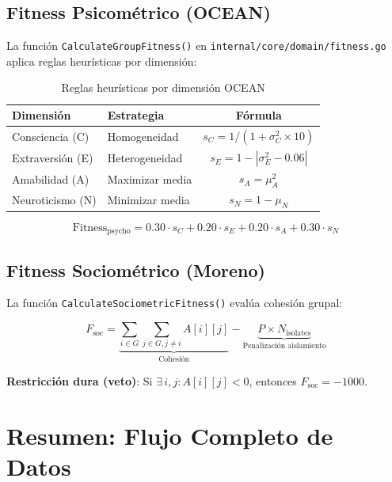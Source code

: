 \documentclass[12pt,a4paper]{article}
\begin{document}
\subsection{Fitness Psicométrico (OCEAN)}

La función \texttt{CalculateGroupFitness()} en \texttt{internal/core/domain/fitness.go} aplica reglas heurísticas por dimensión:

\begin{table}[h]
\centering
\begin{tabular}{llc}
\toprule
\textbf{Dimensión} & \textbf{Estrategia} & \textbf{Fórmula} \\
\midrule
Consciencia (C) & Homogeneidad & $s_C = 1 / (1 + \sigma^2_C \times 10)$ \\
Extraversión (E) & Heterogeneidad & $s_E = 1 - |\sigma^2_E - 0.06|$ \\
Amabilidad (A) & Maximizar media & $s_A = \mu_A^2$ \\
Neuroticismo (N) & Minimizar media & $s_N = 1 - \mu_N$ \\
\bottomrule
\end{tabular}
\caption{Reglas heurísticas por dimensión OCEAN}
\end{table}

\[
\text{Fitness}_{\text{psycho}} = 0.30 \cdot s_C + 0.20 \cdot s_E + 0.20 \cdot s_A + 0.30 \cdot s_N
\]

\subsection{Fitness Sociométrico (Moreno)}

La función \texttt{CalculateSociometricFitness()} evalúa cohesión grupal:

\[
F_{\text{soc}} = \underbrace{\sum_{i \in G} \sum_{j \in G, j \neq i} A[i][j]}_{\text{Cohesión}} - \underbrace{P \times N_{\text{isolates}}}_{\text{Penalización aislamiento}}
\]

\textbf{Restricción dura (veto)}: Si $\exists\, i, j : A[i][j] < 0$, entonces $F_{\text{soc}} = -1000$.

\section{Resumen: Flujo Completo de Datos}
\label{sec:flow}
\end{document}

